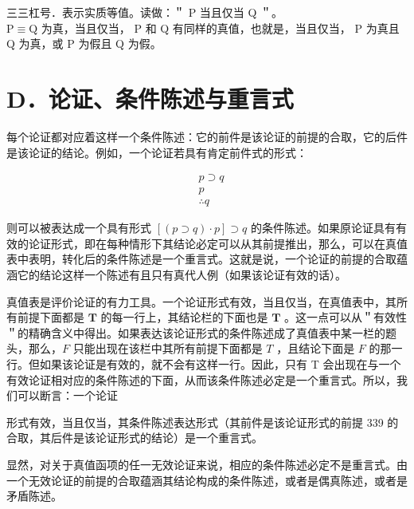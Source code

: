 三三杠号．表示实质等值。读做：＂ P 当且仅当 Q ＂。\\
$\mathrm{P} \equiv \mathrm{Q}$ 为真，当且仅当， P 和 Q 有同样的真值，也就是，当且仅当， P 为真且 Q 为真，或 P 为假且 Q 为假。

\section*{D．论证、条件陈述与重言式}
每个论证都对应着这样一个条件陈述：它的前件是该论证的前提的合取，它的后件是该论证的结论。例如，一个论证若具有肯定前件式的形式：

$$
\begin{aligned}
& p \supset q \\
& p \\
& \therefore q
\end{aligned}
$$

则可以被表达成一个具有形式 $[(p \supset q) \cdot p] \supset q$ 的条件陈述。如果原论证具有有效的论证形式，即在每种情形下其结论必定可以从其前提推出，那么，可以在真值表中表明，转化后的条件陈述是一个重言式。这就是说，一个论证的前提的合取蕴涵它的结论这样一个陈述有且只有真代人例（如果该论证有效的话）。

真值表是评价论证的有力工具。一个论证形式有效，当且仅当，在真值表中，其所有前提下面都是 $\mathbf{T}$ 的每一行上，其结论栏的下面也是 $\mathbf{T}$ 。这一点可以从＂有效性＂的精确含义中得出。如果表达该论证形式的条件陈述成了真值表中某一栏的题头，那么，$F$ 只能出现在该栏中其所有前提下面都是 $T$ ，且结论下面是 $F$ 的那一行。但如果该论证是有效的，就不会有这样一行。因此，只有 T 会出现在与一个有效论证相对应的条件陈述的下面，从而该条件陈述必定是一个重言式。所以，我们可以断言：一个论证

形式有效，当且仅当，其条件陈述表达形式（其前件是该论证形式的前提 339 的合取，其后件是该论证形式的结论）是一个重言式。

显然，对关于真值函项的任一无效论证来说，相应的条件陈述必定不是重言式。由一个无效论证的前提的合取蕴涵其结论构成的条件陈述，或者是偶真陈述，或者是矛盾陈述。

